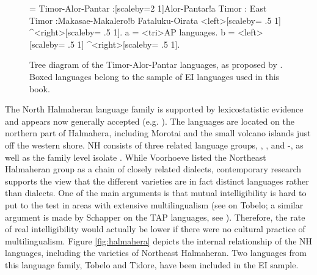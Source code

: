 \begin{figure}

\begin{footnotesize}
\jtree[xunit=5em,yunit=2em]
\! = {Timor-Alor-Pantar}
:[scaleby=2 1]{Alor-Pantar}!a {Timor}
:{} {East Timor}
:{Makasae-Makalero}!b {Fataluku-Oirata}
<left>[scaleby= .5 1]{} ^<right>[scaleby= .5 1]{}.
\!a = <tri>{AP languages}{}.
\!b = <left>[scaleby= .5 1]{} ^<right>[scaleby= .5 1]{}.
\endjtree
\end{footnotesize}

\caption[The Timor-Alor-Pantar languages]{Tree diagram of the Timor-Alor-Pantar languages, as proposed by \citet{schapper2014intro}. Boxed languages belong to the sample of EI languages used in this book.}\label{fig:timor-alor-pantar}
\end{figure}

The North Halmaheran language family is supported by lexicostatistic evidence and appears now generally accepted (e.g. \citealt{Voorhoeve1994, reesink2005west}). The languages are located on the northern part of Halmahera, including Morotai and the small volcano islands just off the western shore. NH consists of three related language groups, , , and -, as well as the family level isolate  \citep{Voorhoeve1994}. While Voor\-hoeve listed the Northeast Halmaheran group as a chain of closely related dialects, contemporary research supports the view that the different varieties are in fact distinct languages rather than dialects. One of the main arguments is that mutual intelligibility is hard to put to the test in areas with extensive multilingualism (see \citealt{holton2003tobelo} on Tobelo; a similar argument is made by Schapper on the TAP languages, see \citealt[3]{schapper2014intro}). Therefore, the rate of real intelligibility would actually be lower if there were no cultural practice of multilingualism. Figure \ref{fig:halmahera} depicts the internal relationship of the NH languages, including the varieties of Northeast Halmaheran. Two languages from this language family, Tobelo and Tidore, have been included in the EI sample.

